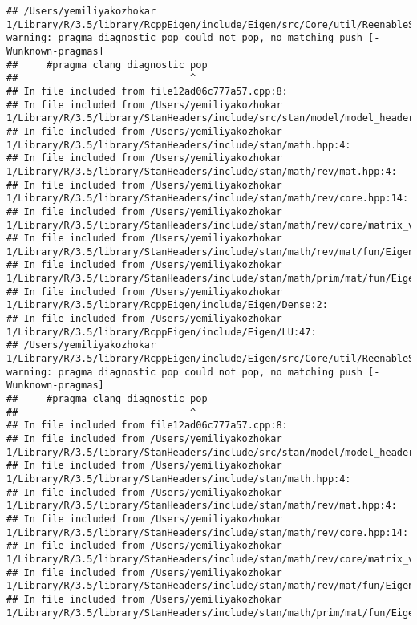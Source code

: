 \documentclass[]{article}
\begin{document}
\begin{verbatim}
## /Users/yemiliyakozhokar 1/Library/R/3.5/library/RcppEigen/include/Eigen/src/Core/util/ReenableStupidWarnings.h:10:30: warning: pragma diagnostic pop could not pop, no matching push [-Wunknown-pragmas]
##     #pragma clang diagnostic pop
##                              ^
## In file included from file12ad06c777a57.cpp:8:
## In file included from /Users/yemiliyakozhokar 1/Library/R/3.5/library/StanHeaders/include/src/stan/model/model_header.hpp:4:
## In file included from /Users/yemiliyakozhokar 1/Library/R/3.5/library/StanHeaders/include/stan/math.hpp:4:
## In file included from /Users/yemiliyakozhokar 1/Library/R/3.5/library/StanHeaders/include/stan/math/rev/mat.hpp:4:
## In file included from /Users/yemiliyakozhokar 1/Library/R/3.5/library/StanHeaders/include/stan/math/rev/core.hpp:14:
## In file included from /Users/yemiliyakozhokar 1/Library/R/3.5/library/StanHeaders/include/stan/math/rev/core/matrix_vari.hpp:4:
## In file included from /Users/yemiliyakozhokar 1/Library/R/3.5/library/StanHeaders/include/stan/math/rev/mat/fun/Eigen_NumTraits.hpp:4:
## In file included from /Users/yemiliyakozhokar 1/Library/R/3.5/library/StanHeaders/include/stan/math/prim/mat/fun/Eigen.hpp:4:
## In file included from /Users/yemiliyakozhokar 1/Library/R/3.5/library/RcppEigen/include/Eigen/Dense:2:
## In file included from /Users/yemiliyakozhokar 1/Library/R/3.5/library/RcppEigen/include/Eigen/LU:47:
## /Users/yemiliyakozhokar 1/Library/R/3.5/library/RcppEigen/include/Eigen/src/Core/util/ReenableStupidWarnings.h:10:30: warning: pragma diagnostic pop could not pop, no matching push [-Wunknown-pragmas]
##     #pragma clang diagnostic pop
##                              ^
## In file included from file12ad06c777a57.cpp:8:
## In file included from /Users/yemiliyakozhokar 1/Library/R/3.5/library/StanHeaders/include/src/stan/model/model_header.hpp:4:
## In file included from /Users/yemiliyakozhokar 1/Library/R/3.5/library/StanHeaders/include/stan/math.hpp:4:
## In file included from /Users/yemiliyakozhokar 1/Library/R/3.5/library/StanHeaders/include/stan/math/rev/mat.hpp:4:
## In file included from /Users/yemiliyakozhokar 1/Library/R/3.5/library/StanHeaders/include/stan/math/rev/core.hpp:14:
## In file included from /Users/yemiliyakozhokar 1/Library/R/3.5/library/StanHeaders/include/stan/math/rev/core/matrix_vari.hpp:4:
## In file included from /Users/yemiliyakozhokar 1/Library/R/3.5/library/StanHeaders/include/stan/math/rev/mat/fun/Eigen_NumTraits.hpp:4:
## In file included from /Users/yemiliyakozhokar 1/Library/R/3.5/library/StanHeaders/include/stan/math/prim/mat/fun/Eigen.hpp:4:

\end{verbatim}
\end{document}
